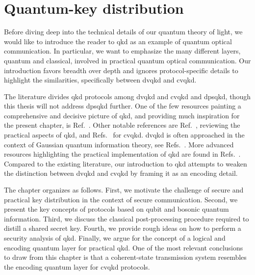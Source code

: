 \chapter{Quantum-key distribution}\label{ch:qkd}

Before diving deep into the technical details of our quantum theory of light, we would like to introduce the reader to \gls{qkd} as an example of quantum optical communication.
In particular, we want to emphasize the many different layers, quantum and classical, involved in practical quantum optical communication.
Our introduction favors breadth over depth and ignores protocol-specific details to highlight the similarities, specifically between \gls{dvqkd} and \gls{cvqkd}.

The literature divides \gls{qkd} protocols among \gls{dvqkd} and \gls{cvqkd} and \gls{dpsqkd}, though this thesis will not address \gls{dpsqkd} further.
One of the few resources painting a comprehensive and decisive picture of \gls{qkd}, and providing much inspiration for the present chapter, is Ref.~\cite{Wolf2021}.
Other notable references are Ref.~\cite{Diamanti2016}, reviewing the practical aspects of \gls{qkd}, and Refs.~\cite{Duvsek2006,Gisin2002} for \gls{cvqkd}.
\gls{dvqkd} is often approached in the context of Gaussian quantum information theory, see Refs.~\cite{Weedbrook2012,Ferraro2005}.
More advanced resources highlighting the practical implementation of \gls{qkd} are found in Refs.~\cite{Scarani2009,Fung2010,Laudenbach2018}.
Compared to the existing literature, our introduction to \gls{qkd} attempts to weaken the distinction between \gls{dvqkd} and \gls{cvqkd} by framing it as an encoding detail.

The chapter organizes as follows. 
First, we motivate the challenge of secure and practical key distribution in the context of secure communication.
Second, we present the key concepts of protocols based on qubit and bosonic quantum information.
Third, we discuss the classical post-processing procedure required to distill a shared secret key.
Fourth, we provide rough ideas on how to perform a security analysis of \gls{qkd}.
Finally, we argue for the concept of a logical and encoding quantum layer for practical \gls{qkd}.
One of the most relevant conclusions to draw from this chapter is that a coherent-state transmission system resembles the encoding quantum layer for \gls{cvqkd} protocols.